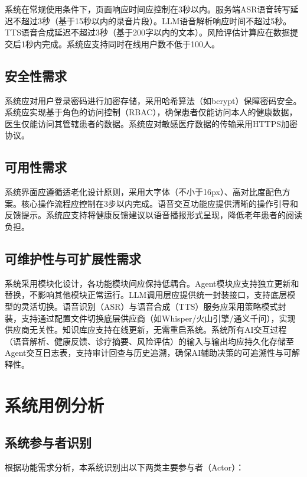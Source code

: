 系统在常规使用条件下，页面响应时间应控制在3秒以内。服务端ASR语音转写延迟不超过3秒（基于15秒以内的录音片段）。LLM语音解析响应时间不超过5秒。TTS语音合成延迟不超过3秒（基于200字以内的文本）。风险评估计算应在数据提交后1秒内完成。系统应支持同时在线用户数不低于100人。

\subsection{安全性需求}

系统应对用户登录密码进行加密存储，采用哈希算法（如bcrypt）保障密码安全。系统应实现基于角色的访问控制（RBAC），确保患者仅能访问本人的健康数据，医生仅能访问其管辖患者的数据。系统应对敏感医疗数据的传输采用HTTPS加密协议。

\subsection{可用性需求}

系统界面应遵循适老化设计原则，采用大字体（不小于16px）、高对比度配色方案。核心操作流程应控制在3步以内完成。语音交互功能应提供清晰的操作引导和反馈提示。系统应支持将健康反馈建议以语音播报形式呈现，降低老年患者的阅读负担。

\subsection{可维护性与可扩展性需求}

系统采用模块化设计，各功能模块间应保持低耦合。Agent模块应支持独立更新和替换，不影响其他模块正常运行。LLM调用层应提供统一封装接口，支持底层模型的灵活切换。语音识别（ASR）与语音合成（TTS）服务应采用策略模式封装，支持通过配置文件切换底层供应商（如Whisper/火山引擎/通义千问），实现供应商无关性。知识库应支持在线更新，无需重启系统。系统所有AI交互过程（语音解析、健康反馈、诊疗摘要、风险评估）的输入与输出均应持久化存储至Agent交互日志表，支持审计回查与历史追溯，确保AI辅助决策的可追溯性与可解释性。


\section{系统用例分析}

\subsection{系统参与者识别}

根据功能需求分析，本系统识别出以下两类主要参与者（Actor）：

